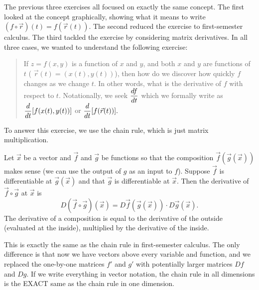 


The previous three exercises all focused on exactly the same concept.  The first looked at the concept graphically, showing  what it means to write $(f\circ \vec r)(t)=f(\vec r(t))$. The second reduced the exercise to first-semester calculus. The third tackled the exercise by considering matrix derivatives.  In all three cases, we wanted to understand the following exercise:
\begin{quote}
 If $z=f(x,y)$ is a function of $x$ and $y$, and both $x$ and $y$ are functions of $t$ ( $\vec r(t)=(x(t),y(t))$), then how do we discover how quickly $f$ changes as we change $t$. In other words, what is the derivative of $f$ with respect to $t$. Notationally, we seek $\displaystyle \frac{df}{dt}$ which we formally write as $\displaystyle \frac{d}{dt}[f(x(t),y(t))]$ or $\displaystyle \frac{d}{dt} [f(\vec r(t))].$
\end{quote}
To answer this exercise, we use the chain rule, which is just matrix multiplication.
\begin{theorem}\label{def:chain rule}
 Let $\vec x$ be a vector and $\vec f$ and $\vec g$ be functions so that the composition $\vec f(\vec g(\vec x))$ makes sense (we can use the output of $g$ as an input to $f$). Suppose $\vec f$ is differentiable at $\vec g(\vec x)$ and that $\vec g$ is differentiable at $\vec x$. Then the derivative of $\vec f\circ \vec g$ at $\vec x$ is 
$$D(\vec f\circ \vec g)(\vec x) = D\vec f(\vec g(\vec x))\cdot D\vec g(\vec x).$$
 The derivative of a composition is equal to the derivative of the outside (evaluated at the inside), multiplied by the derivative of the inside.  
\end{theorem}
This is exactly the same as the chain rule in first-semester calculus.  The only difference is that now we have vectors above every variable and function, and we replaced the one-by-one matrices $f'$ and $g'$ with potentially larger matrices $Df$ and $Dg$. If we write everything in vector notation, the chain rule in all dimensions is the EXACT same as the chain rule in one dimension.

